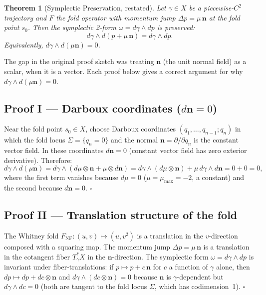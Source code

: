 \documentclass[14pt,a4paper]{extarticle}
\newtheorem{theorem}{Theorem}[section]
\begin{document}
\begin{theorem}[Symplectic Preservation, restated]
\label{thm:symplectic-full}
Let $\gamma \in X$ be a piecewise-$C^2$ trajectory and $F$ the
fold operator with momentum jump $\Delta p = \mu\,\mathbf{n}$ at the
fold point $s_0$.  Then the symplectic 2-form $\omega = d\gamma \wedge dp$
is preserved:
\[
  d\gamma \wedge d\!\left(p + \mu\,\mathbf{n}\right) = d\gamma \wedge dp.
\]
Equivalently, $d\gamma \wedge d(\mu\mathbf{n}) = 0$.
\end{theorem}

The gap in the original proof sketch was treating $\mathbf{n}$
(the unit normal field) as a scalar, when it is a vector.
Each proof below gives a correct argument for why
$d\gamma \wedge d(\mu\mathbf{n}) = 0$.

\subsection*{Proof I\; — Darboux coordinates ($d\mathbf{n} = 0$)}

Near the fold point $s_0 \in X$, choose Darboux coordinates
$(q_1,\ldots,q_{n-1}; q_n)$ in which the fold locus
$\Sigma = \{q_n = 0\}$ and the normal $\mathbf{n} = \partial/\partial q_n$
is the constant vector field.
In these coordinates $d\mathbf{n} = 0$ (constant vector field has zero exterior derivative).
Therefore:
\[
  d\gamma \wedge d(\mu\mathbf{n})
    = d\gamma \wedge (d\mu \otimes \mathbf{n} + \mu \otimes d\mathbf{n})
    = d\gamma \wedge (d\mu \otimes \mathbf{n})
    + \mu\, d\gamma \wedge d\mathbf{n}
    = 0 + 0 = 0,
\]
where the first term vanishes because $d\mu = 0$
($\mu = \mu_{\max} = -2$, a constant) and the second because $d\mathbf{n}=0$.
\hfill $\square$

\subsection*{Proof II\; — Translation structure of the fold}

The Whitney fold $F_{\mathrm{NF}}: (u,v) \mapsto (u, v^2)$ is a
translation in the $v$-direction composed with a squaring map.
The momentum jump $\Delta p = \mu\,\mathbf{n}$ is a translation
in the cotangent fiber $T^*_\gamma X$ in the $\mathbf{n}$-direction.
The symplectic form $\omega = d\gamma \wedge dp$ is invariant
under fiber-translations: if $p \mapsto p + c\,\mathbf{n}$ for
$c$ a function of $\gamma$ alone, then
$dp \mapsto dp + dc \otimes \mathbf{n}$ and
$d\gamma \wedge (dc \otimes \mathbf{n}) = 0$
because $\mathbf{n}$ is $\gamma$-dependent but $d\gamma \wedge dc = 0$
(both are tangent to the fold locus $\Sigma$, which has codimension~1).
\hfill $\square$
\end{document}
